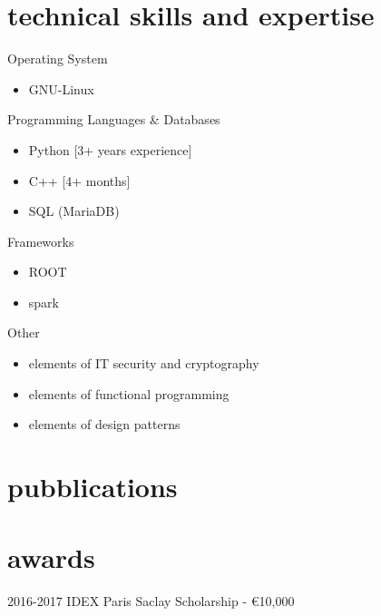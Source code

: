 \documentclass[]{cv-style}     %
\begin{document}
\section{technical skills and expertise}
\par\vspace{.5\parskip}%
 {\color{gray}\headingfont Operating System}
 \begin{itemize}
  \item GNU-Linux
 \end{itemize}
 {\color{gray}\headingfont Programming Languages & Databases}
 \begin{itemize}
  \item Python [3+ years experience]
  \item C++ [4+ months]
  \item SQL (MariaDB)
 \end{itemize}
 {\color{gray}\headingfont Frameworks}
 \begin{itemize}
  \item ROOT
  \item spark
 \end{itemize}
 {\color{gray}\headingfont Other}
 {%
 \begin{itemize}
  \item elements of IT security and cryptography
  \item elements of functional programming
  \item elements of design patterns
 \end{itemize}
 }
 \par\vspace{.5\parskip}
 
\pagebreak
\section{pubblications}
\section{awards}
\par\vspace{.5\parskip}%
\begin{entrylist}
\entry
{2016-2017}
{IDEX Paris Saclay Scholarship - \euro 10,000}
{}
{}
\end{entrylist}
\end{document}
